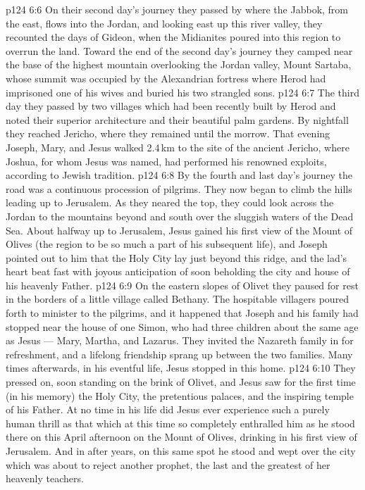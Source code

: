 \vs p124 6:6 \pc On their second day’s journey they passed by where the Jabbok, from the east, flows into the Jordan, and looking east up this river valley, they recounted the days of Gideon, when the Midianites poured into this region to overrun the land. Toward the end of the second day’s journey they camped near the base of the highest mountain overlooking the Jordan valley, Mount Sartaba, whose summit was occupied by the Alexandrian fortress where Herod had imprisoned one of his wives and buried his two strangled sons.
\vs p124 6:7 The third day they passed by two villages which had been recently built by Herod and noted their superior architecture and their beautiful palm gardens. By nightfall they reached Jericho, where they remained until the morrow. That evening Joseph, Mary, and Jesus walked 2.4\,km to the site of the ancient Jericho, where Joshua, for whom Jesus was named, had performed his renowned exploits, according to Jewish tradition.
\vs p124 6:8 By the fourth and last day’s journey the road was a continuous procession of pilgrims. They now began to climb the hills leading up to Jerusalem. As they neared the top, they could look across the Jordan to the mountains beyond and south over the sluggish waters of the Dead Sea. About halfway up to Jerusalem, Jesus gained his first view of the Mount of Olives (the region to be so much a part of his subsequent life), and Joseph pointed out to him that the Holy City lay just beyond this ridge, and the lad’s heart beat fast with joyous anticipation of soon beholding the city and house of his heavenly Father.
\vs p124 6:9 On the eastern slopes of Olivet they paused for rest in the borders of a little village called Bethany. The hospitable villagers poured forth to minister to the pilgrims, and it happened that Joseph and his family had stopped near the house of one Simon, who had three children about the same age as Jesus --- Mary, Martha, and Lazarus. They invited the Nazareth family in for refreshment, and a lifelong friendship sprang up between the two families. Many times afterwards, in his eventful life, Jesus stopped in this home.
\vs p124 6:10 They pressed on, soon standing on the brink of Olivet, and Jesus saw for the first time (in his memory) the Holy City, the pretentious palaces, and the inspiring temple of his Father. At no time in his life did Jesus ever experience such a purely human thrill as that which at this time so completely enthralled him as he stood there on this April afternoon on the Mount of Olives, drinking in his first view of Jerusalem. And in after years, on this same spot he stood and wept over the city which was about to reject another prophet, the last and the greatest of her heavenly teachers.
